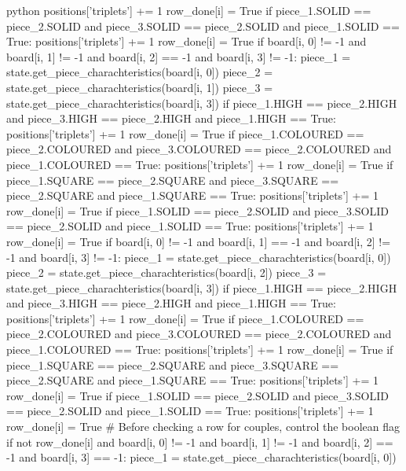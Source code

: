 \begin{mintedbox}{python}
                positions['triplets'] += 1
                row_done[i] = True
            if piece_1.SOLID == piece_2.SOLID and piece_3.SOLID == piece_2.SOLID and piece_1.SOLID == True:
                positions['triplets'] += 1
                row_done[i] = True
        if board[i, 0] != -1 and board[i, 1] != -1 and board[i, 2] == -1 and board[i, 3] != -1:
            piece_1 = state.get_piece_charachteristics(board[i, 0])
            piece_2 = state.get_piece_charachteristics(board[i, 1])
            piece_3 = state.get_piece_charachteristics(board[i, 3])
            if piece_1.HIGH == piece_2.HIGH and piece_3.HIGH == piece_2.HIGH and piece_1.HIGH == True:
                positions['triplets'] += 1
                row_done[i] = True
            if piece_1.COLOURED == piece_2.COLOURED and piece_3.COLOURED == piece_2.COLOURED and piece_1.COLOURED == True:
                positions['triplets'] += 1
                row_done[i] = True
            if piece_1.SQUARE == piece_2.SQUARE and piece_3.SQUARE == piece_2.SQUARE and piece_1.SQUARE == True:
                positions['triplets'] += 1
                row_done[i] = True
            if piece_1.SOLID == piece_2.SOLID and piece_3.SOLID == piece_2.SOLID and piece_1.SOLID == True:
                positions['triplets'] += 1
                row_done[i] = True
        if board[i, 0] != -1 and board[i, 1] == -1 and board[i, 2] != -1 and board[i, 3] != -1:
            piece_1 = state.get_piece_charachteristics(board[i, 0])
            piece_2 = state.get_piece_charachteristics(board[i, 2])
            piece_3 = state.get_piece_charachteristics(board[i, 3])
            if piece_1.HIGH == piece_2.HIGH and piece_3.HIGH == piece_2.HIGH and piece_1.HIGH == True:
                positions['triplets'] += 1
                row_done[i] = True
            if piece_1.COLOURED == piece_2.COLOURED and piece_3.COLOURED == piece_2.COLOURED and piece_1.COLOURED == True:
                positions['triplets'] += 1
                row_done[i] = True
            if piece_1.SQUARE == piece_2.SQUARE and piece_3.SQUARE == piece_2.SQUARE and piece_1.SQUARE == True:
                positions['triplets'] += 1
                row_done[i] = True
            if piece_1.SOLID == piece_2.SOLID and piece_3.SOLID == piece_2.SOLID and piece_1.SOLID == True:
                positions['triplets'] += 1
                row_done[i] = True
        # Before checking a row for couples, control the boolean flag
        if not row_done[i] and board[i, 0] != -1 and board[i, 1] != -1 and board[i, 2] == -1 and board[i, 3] == -1:
            piece_1 = state.get_piece_charachteristics(board[i, 0])

\end{mintedbox}
